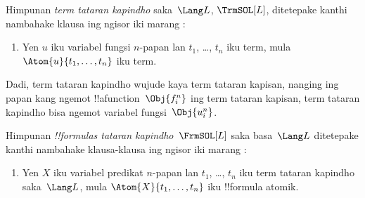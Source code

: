 \documentclass[../../../include/open-logic-section]{subfiles}
\begin{document}
\begin{defn}
Himpunan \emph{term tataran kapindho} saka~$\Lang L$,
$\TrmSOL[L]$, ditetepake kanthi nambahake klausa ing ngisor
iki marang :
\begin{enumerate}
\item Yen $u$ iku variabel fungsi $n$-papan lan $t_1$, \dots,
  $t_n$ iku term, mula $\Atom{u}{t_1, \ldots, t_n}$ iku term.
\end{enumerate}
\end{defn}

\begin{explain}
Dadi, term tataran kapindho wujude kaya term tataran kapisan, nanging
ing papan kang ngemot !!a{function}~$\Obj{f^n_i}$ ing term tataran
kapisan, term tataran kapindho bisa ngemot variabel fungsi~$\Obj{u^n_i}$.
\end{explain}

\begin{defn}
Himpunan \emph{!!{formula}s tataran kapindho}~$\FrmSOL[L]$
saka basa~$\Lang L$ ditetepake kanthi nambahake klausa-klausa
ing ngisor iki marang :
\begin{enumerate}
\item Yen $X$ iku variabel predikat $n$-papan lan $t_1$, \dots,
  $t_n$ iku term tataran kapindho saka~$\Lang L$, mula
  $\Atom{X}{t_1,\ldots, t_n}$ iku !!{formula} atomik.




\end{enumerate}
\end{defn}
\end{document}
